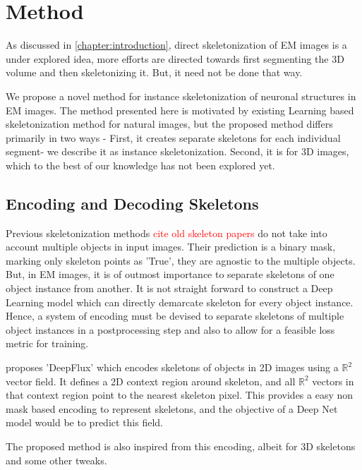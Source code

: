 
\chapter{Method}\label{chapter:method}

As discussed in \autoref{chapter:introduction}, direct skeletonization of EM images is a under explored idea, more efforts are directed towards first segmenting the 3D volume and then skeletonizing it. But, it need not be done that way.

We propose a novel method for instance skeletonization of neuronal structures in EM images. The method presented here is motivated by existing Learning based skeletonization method for natural images, but the proposed method differs primarily in two  ways - First, it creates separate skeletons for each individual segment- we describe it as instance skeletonization. Second, it is for 3D images, which to the best of our knowledge has not been explored yet. 
 
\section{Encoding and Decoding Skeletons}
Previous skeletonization methods \textcolor{red}{cite old skeleton papers} do not take into account multiple objects in input images. Their prediction is a binary mask, marking only skeleton points as 'True', they are agnostic to the multiple objects.
But, in EM images, it is of outmost importance to separate skeletons of one object instance from another. It is not straight forward to construct a Deep Learning model which can directly demarcate skeleton for every object instance. Hence, a system of encoding must be devised to separate skeletons of multiple object instances in a postprocessing step and also to allow for a feasible loss metric for training. 

\cite{Wang2019} proposes 'DeepFlux' which encodes skeletons of objects in 2D images using a $\mathbb{R}^2$ vector field. It defines a 2D context region around skeleton, and all $\mathbb{R}^2$ vectors in that context region point to the nearest skeleton pixel. This provides a easy non mask based encoding to represent skeletons, and the objective of a Deep Net model would be to predict this field.

The proposed method is also inspired from this encoding, albeit for 3D skeletons and some other tweaks.


